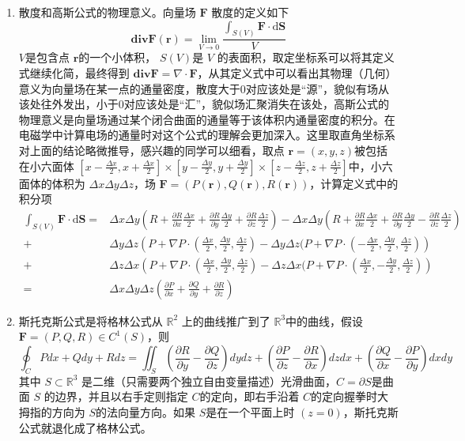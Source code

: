 \begin{enumerate}
    \item 散度和高斯公式的物理意义。向量场 $\mathbf{F}$ 散度的定义如下
    \[
        \mathbf{div} \mathbf{F}(\mathbf{r}) = \lim _{V \to 0} \frac{\int _{S(V)} \mathbf{F} \cdot \mathrm{d} \mathbf{S}}{V}
    \]
    $V$是包含点 $\mathbf{r}$的一个小体积， $S(V)$是 $V$ 的表面积，取定坐标系可以将其定义式继续化简，最终得到 $\mathbf{div F} = \nabla \cdot \mathbf{F}$，从其定义式中可以看出其物理（几何）意义为向量场在某一点的通量密度，散度大于0对应该处是“源”，貌似有场从该处往外发出，小于0对应该处是“汇”，貌似场汇聚消失在该处，高斯公式的物理意义是向量场通过某个闭合曲面的通量等于该体积内通量密度的积分。在电磁学中计算电场的通量时对这个公式的理解会更加深入。这里取直角坐标系对上面的结论略微推导，感兴趣的同学可以细看，取点 $\mathbf{r} = (x,y,z)$被包括在小六面体 $[x - \frac{\Delta x}{2}, x+ \frac{\Delta x}{2}] \times [y - \frac{\Delta y}{2}, y+ \frac{\Delta y}{2}] \times [z - \frac{\Delta z}{2}, z+ \frac{\Delta z}{2}] $中，小六面体的体积为 $\Delta x \Delta y \Delta z$，场 $\mathbf{F} = (P(\mathbf{r}), Q(\mathbf{r}), R(\mathbf{r}))$，计算定义式中的积分项
    \begin{align*}
        \int _{S(V)} \mathbf{F} \cdot \mathrm{d} \mathbf{S}
        =& \Delta x \Delta y (R + \frac{\partial R}{\partial x} \frac{\Delta x}{2} + \frac{\partial R}{\partial y} \frac{\Delta y}{2} + \frac{\partial R}{\partial z} \frac{\Delta z}{2} ) - \Delta x \Delta y (R + \frac{\partial R}{\partial x} \frac{\Delta x}{2} + \frac{\partial R}{\partial y} \frac{\Delta y}{2} - \frac{\partial R}{\partial z} \frac{\Delta z}{2} ) \\
        +& \Delta y \Delta z \left( P + \nabla P \cdot (\frac{\Delta x}{2},\frac{\Delta y}{2}, \frac{\Delta z}{2} ) -  \Delta y \Delta z (P + \nabla P \cdot (-\frac{\Delta x}{2},\frac{\Delta y}{2}, \frac{\Delta z}{2} ) \right) \\
        +& \Delta z \Delta x \left( P + \nabla P \cdot (\frac{\Delta x}{2},\frac{\Delta y}{2}, \frac{\Delta z}{2} ) -  \Delta z \Delta x (P + \nabla P \cdot (\frac{\Delta x}{2},-\frac{\Delta y}{2}, \frac{\Delta z}{2} ) \right) \\
        =& \Delta x \Delta y \Delta z (\frac{\partial P}{\partial x}+\frac{\partial Q}{\partial y}+\frac{\partial R}{\partial z})
    \end{align*}

    \item 斯托克斯公式是将格林公式从 $\mathbb{R}^2$ 上的曲线推广到了 $\mathbb{R}^3$中的曲线，假设 $\mathbf{F}=(P,Q,R) \in C^1(S)$，则
    \[
        \oint_CPdx+Qdy+Rdz=\iint_S\left(\frac{\partial R}{\partial y}-\frac{\partial Q}{\partial z}\right)dydz+\left(\frac{\partial P}{\partial z}-\frac{\partial R}{\partial x}\right)dzdx+\left(\frac{\partial Q}{\partial x}-\frac{\partial P}{\partial y}\right)dxdy
    \]
    其中 $S \subset \mathbb{R}^3$ 是二维（只需要两个独立自由变量描述）光滑曲面，$C = \partial S$是曲面 $S$ 的边界，并且以右手定则指定 $C$的定向，即右手沿着 $C$的定向握拳时大拇指的方向为 $S$的法向量方向。如果 $S$是在一个平面上时 $(z=0)$，斯托克斯公式就退化成了格林公式。


\end{enumerate}
